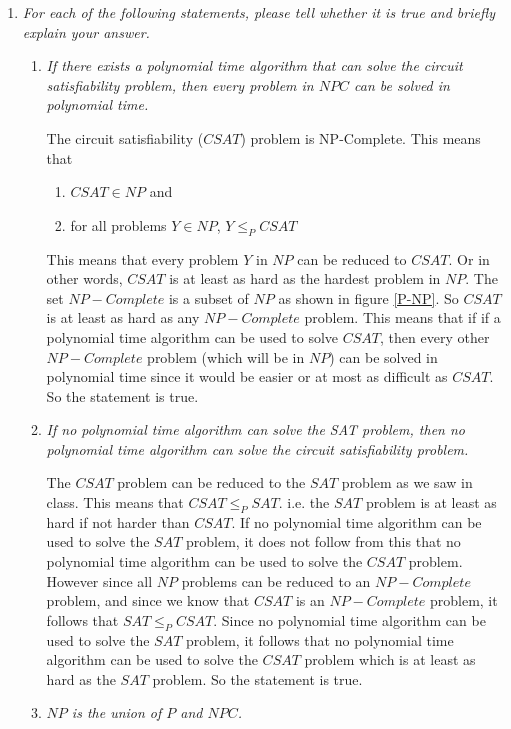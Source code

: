 \documentclass[paper=a4, fontsize=11pt]{scrartcl} %
\numberwithin{equation}{section} %
\numberwithin{figure}{section} %
\numberwithin{table}{section} %
\begin{document}
\begin{enumerate}
  \item \textit{For each of the following statements, please tell whether it is true and briefly explain your answer.}
  \begin{enumerate}
    \item \textit{If there exists a polynomial time algorithm that can solve the circuit satisfiability problem, then every problem in $NPC$ can be solved in polynomial time.}
    
The circuit satisfiability ($CSAT$) problem is NP-Complete. This means that
\begin{enumerate}
\item $CSAT \in NP$ and
\item for all problems $Y \in NP$, $Y \leq_P CSAT$ 
\end{enumerate}
This means that every problem $Y$ in $NP$ can be reduced to $CSAT$. Or in other words, $CSAT$ is at least as hard as the hardest problem in $NP$. The set $NP-Complete$ is a subset of $NP$ as shown in figure \ref{P-NP}. So $CSAT$ is at least as hard as any $NP-Complete$ problem. This means that if if a polynomial time algorithm can be used to solve $CSAT$, then every other $NP-Complete$ problem (which will be in $NP$) can be solved in polynomial time since it would be easier or at most as difficult as $CSAT$. So the statement is true.

    \item \textit{If no polynomial time algorithm can solve the SAT problem, then no polynomial time algorithm can solve the circuit satisfiability problem.}
    
    The $CSAT$ problem can be reduced to the $SAT$ problem as we saw in class. This means that $CSAT \leq_P SAT$. i.e. the $SAT$ problem is at least as hard if not harder than $CSAT$. If no polynomial time algorithm can be used to solve the $SAT$ problem, it does not follow from this that no polynomial time algorithm can be used to solve the $CSAT$ problem. However since all $NP$ problems can be reduced to an $NP-Complete$ problem, and since we know that $CSAT$ is an $NP-Complete$ problem, it follows that $SAT \leq_P CSAT$. Since no polynomial time algorithm can be used to solve the $SAT$ problem, it follows that no polynomial time algorithm can be used to solve the $CSAT$ problem which is at least as hard as the $SAT$ problem. So the statement is true.
    
    \item \textit{$NP$ is the union of $P$ and $NPC$.}
    

\end{enumerate}
\end{enumerate}
\end{document}
